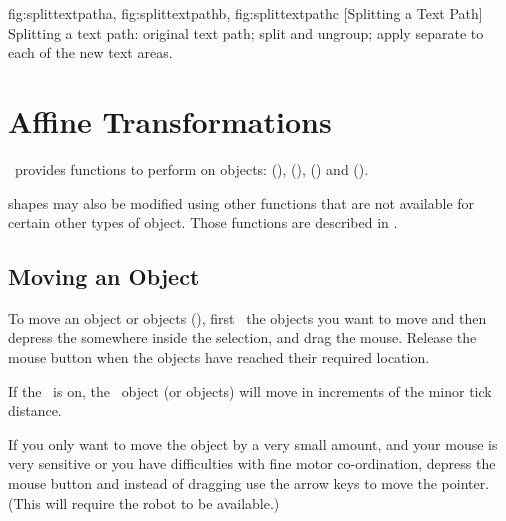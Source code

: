 {
  {fig:splittextpatha}{}{},
  {fig:splittextpathb}{}{},
  {fig:splittextpathc}{}{}
}
[Splitting a Text Path]
{Splitting a text path:
 original text path;
 split and ungroup;
 apply
separate  to each of the new text areas.}


\chapter{Affine Transformations}\label{sec:affinetrans}

\FlowframTk\ provides functions to perform 
 on \glspl{object}:
 (), 
 (), 
 () and 
 ().

\Glspl{shape} may also be modified using other functions
that are not available for certain other types of \gls{object}. Those
functions are described in .

\section{Moving an Object}\label{sec:moveobjects}

To move an \gls{object} or \glspl*{object}
(), first \select\ the
\glspl*{object} you want to move and then depress the
 somewhere inside the
selection, and drag the mouse.  Release the mouse button when the
\glspl*{object} have reached their required location.

\begin{important}
If the \gridlock\ is on, the \selected\
\gls{object} (or \glspl{object}) will move
in increments of the minor tick distance.
\end{important}

If you only want to move the object by a very small amount, and your
mouse is very sensitive or you have difficulties with fine motor
co-ordination, depress the mouse button and instead of dragging use
the arrow keys to move the pointer. (This will require the
\gls{robot} to be available.)

